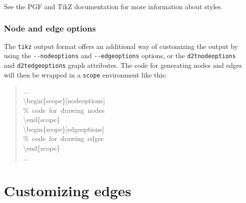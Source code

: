 \documentclass[10pt,a4paper,english]{article}
\newlength{\admonitionwidth}
\begin{document}
See the PGF and TikZ documentation for more information about styles.
\begin{center}\begin{sffamily}
\end{sffamily}
\end{center}



\hypertarget{node-and-edge-options}{}
\subsubsection*{Node and edge options}
\label{node-and-edge-options}

The \texttt{tikz} output format offers an additional way of customizing the output by using the \texttt{-{}-nodeoptions} and \texttt{-{}-edgeoptions} options, or the \texttt{d2tnodeoptions} and \texttt{d2tedgeoptions} graph attributes. The code for generating nodes and edges will then be wrapped in a \texttt{scope} environment like this:
\begin{quote}{\ttfamily \raggedright \noindent
...~\\
{\textbackslash}begin{\{}scope{\}}{[}nodeoptions{]}~\\
{\%}~code~for~drawing~nodes~\\
{\textbackslash}end{\{}scope{\}}~\\
{\textbackslash}begin{\{}scope{\}}{[}edgeoptions{]}~\\
{\%}~code~for~drawing~edges~\\
{\textbackslash}end{\{}scope{\}}~\\
...
}\end{quote}



\hypertarget{customizing-edges}{}
\section*{Customizing edges}
\label{customizing-edges}
\end{document}
